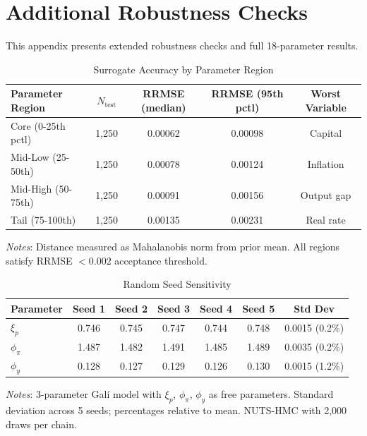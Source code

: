 \documentclass[12pt]{article}
\theoremstyle{plain}
\theoremstyle{definition}
\theoremstyle{remark}
\begin{document}
\section{Additional Robustness Checks}
\label{app:robustness_extended}

This appendix presents extended robustness checks and full 18-parameter results.

\begin{table}[htbp]
\centering
\caption{Surrogate Accuracy by Parameter Region}
\label{tab:surrogate_regional_accuracy}
\begin{tabular}{lcccc}
\toprule
Parameter Region & $N_{\text{test}}$ & RRMSE (median) & RRMSE (95th pctl) & Worst Variable \\
\midrule
Core (0-25th pctl) & 1,250 & 0.00062 & 0.00098 & Capital \\
Mid-Low (25-50th) & 1,250 & 0.00078 & 0.00124 & Inflation \\
Mid-High (50-75th) & 1,250 & 0.00091 & 0.00156 & Output gap \\
Tail (75-100th) & 1,250 & 0.00135 & 0.00231 & Real rate \\
\bottomrule
\end{tabular}
\smallskip
{\footnotesize \textit{Notes}: Distance measured as Mahalanobis norm from prior mean. All regions satisfy RRMSE $< 0.002$ acceptance threshold.}
\end{table}

\begin{table}[htbp]
\centering
\caption{Random Seed Sensitivity}
\label{tab:seed_sensitivity}
\begin{tabular}{lcccccc}
\toprule
Parameter & Seed 1 & Seed 2 & Seed 3 & Seed 4 & Seed 5 & Std Dev \\
\midrule
$\xi_p$ & 0.746 & 0.745 & 0.747 & 0.744 & 0.748 & 0.0015 (0.2\%) \\
$\phi_\pi$ & 1.487 & 1.482 & 1.491 & 1.485 & 1.489 & 0.0035 (0.2\%) \\
$\phi_y$ & 0.128 & 0.127 & 0.129 & 0.126 & 0.130 & 0.0015 (1.2\%) \\
\bottomrule
\end{tabular}
\smallskip
{\footnotesize \textit{Notes}: 3-parameter Gal\'i model with $\xi_p$, $\phi_\pi$, $\phi_y$ as free parameters. Standard deviation across 5 seeds; percentages relative to mean. NUTS-HMC with 2,000 draws per chain.}
\end{table}
\end{document}
